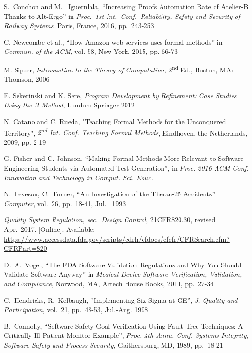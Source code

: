 \documentclass[12pt,journal,duplex]{IEEEtran}
\begin{document}
	\begin{thebibliography}{2}
		S.~Conchon and M.~ Iguernlala, ``Increasing Proofs Automation Rate of Atelier-B Thanks to Alt-Ergo'' in \emph{Proc.~1st Int.~Conf.~Reliability, Safety and Security of Railway Systems}. Paris, France, 2016, pp.~243-253
		
		C. Newcombe et al., ``How Amazon web services uses formal methods'' in \emph{Commun. of the ACM}, vol. 58, New York, 2015, pp. 66-73
		
		M. Sipser, \emph{Introduction to the Theory of Computation}, 2\textsuperscript{nd} Ed., Boston, MA: Thomson, 2006

		E. Sekerinski and K. Sere, \emph{Program Development by Refinement: Case Studies Using the B Method}, London: Springer 2012
		
		N. Catano and C. Rueda, "Teaching Formal Methods for the Unconquered Territory", \emph{2\textsuperscript{nd} Int. Conf. Teaching Formal Methods}, Eindhoven, the Netherlands, 2009, pp. 2-19

		G. Fisher and C. Johnson, ``Making Formal Methods More Relevant to Software Engineering Students via Automated Test Generation'', in \emph{Proc. 2016 ACM Conf. Innovation and Technology in Comput. Sci. Educ.}

		N.~Leveson, C.~Turner, ``An Investigation of the Therac-25 Accidents'', \emph{Computer}, vol.~26, pp.~18-41, Jul.~ 1993

		\emph{Quality System Regulation, sec.~Design Control}, 21CFR820.30, revised Apr.~2017. [Online]. Available:
		\url{https://www.accessdata.fda.gov/scripts/cdrh/cfdocs/cfcfr/CFRSearch.cfm?CFRPart=820}

		D.~A.~Vogel, ``The FDA Software Validation Regulations and Why You Should Validate Software Anyway'' in \emph{Medical Device Software Verification, Validation, and Compliance}, Norwood, MA, Artech House Books, 2011, pp.~27-34

		C.~Hendricks, R.~Kelbaugh, ``Implementing Six Sigma at GE'', \emph{J. Quality and Participation}, vol.~21, pp.~48-53, Jul.-Aug. 1998

		B.~Connolly, ``Software Safety Goal Verification Using Fault Tree Techniques: A Critically Ill Patient Monitor Example'', \emph{Proc. 4th Annu. Conf. Systems Integrity, Software Safety and Process Security}, Gaithersburg, MD, 1989, pp.~18-21


\end{thebibliography}
\end{document}
